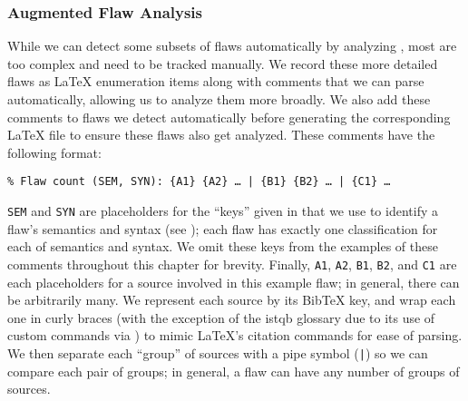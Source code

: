 \subsubsection{Augmented Flaw Analysis}
\label{aug-flaw-analysis}
While we can detect some subsets of flaws automatically by analyzing
\ourApproachGlossary, most are too complex and need to be tracked manually. We
record these more detailed flaws as \LaTeX{} enumeration items along with
comments that we can parse automatically, allowing us to analyze them more
broadly. We also add these comments to flaws we detect automatically before
generating the corresponding \LaTeX{} file to ensure these flaws also get
analyzed. These comments have the following format:
\begin{displayquote}
    \texttt{\% Flaw count (SEM, SYN): \{A1\} \{A2\} \dots{} | \{B1\} \{B2\}
        \dots{} | \{C1\} \dots}
\end{displayquote}
\texttt{SEM} and \texttt{SYN} are placeholders for the ``keys'' given in
 that we use to identify
a flaw's semantics and syntax (see ); each flaw has exactly one
classification for each of semantics and syntax. We omit
these keys from the examples of these comments throughout this chapter for
brevity. Finally, \texttt{A1}, \texttt{A2}, \texttt{B1},
\texttt{B2}, and \texttt{C1} are each placeholders for a source involved in
this example flaw; in general, there can be arbitrarily many. We represent each
source by its BibTeX key, and wrap each one in curly braces (with the exception
of the \acs{istqb} glossary due to its use of custom commands via
) to mimic \LaTeX{}'s citation commands for ease of parsing.
We then separate each ``group'' of sources with a pipe symbol (\texttt{|}) so
we can compare each pair of groups; in general, a flaw can have any number of
groups of sources.

